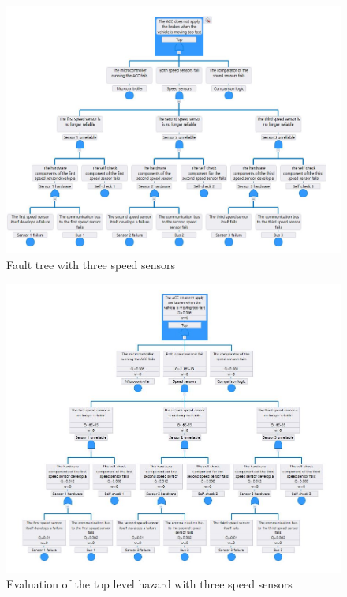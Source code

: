\documentclass[a4paper]{article}
\begin{document}
\begin{figure}
	\centering
	\includegraphics[width=\textwidth]{fault_tree_imsc.jpg}
	\caption{Fault tree with three speed sensors}%
	\label{fig:fault_tree_imsc}
\end{figure}

\begin{figure}
	\centering
	\includegraphics[width=\textwidth]{eval_imsc.jpg}
	\caption{Evaluation of the top level hazard with three speed sensors}%
	\label{fig:eval_imsc}
\end{figure}
\end{document}
